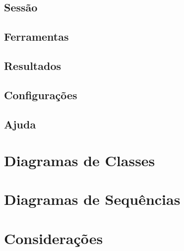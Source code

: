 \subsection{Sessão}
\subsection{Ferramentas}
\subsection{Resultados}
\subsection{Configurações}
\subsection{Ajuda}

\section{Diagramas de Classes}

\section{Diagramas de Sequências}
\section{Considerações}
